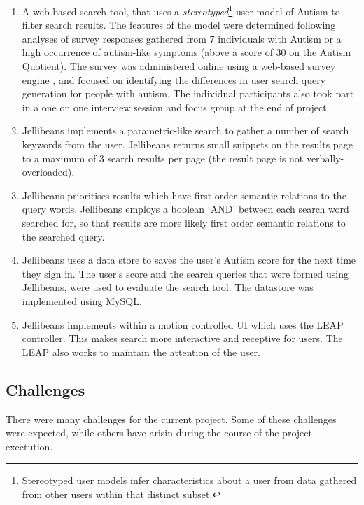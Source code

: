 \documentclass[a4paper, 11pt]{article}
\begin{document}
\begin{enumerate}
\item {A web-based search tool, that uses a \textit{stereotyped}\footnote{Stereotyped user models infer characteristics about a user from data gathered from other users within that distinct subset.} user model of Autism to filter search results. The features of the model were determined following analyses of survey responses gathered from 7 individuals with Autism or a high occurrence of autism-like symptoms (above a score of 30 on the Autism Quotient). The survey was administered online using a web-based survey engine \cite{surveymonkey}, and focused on identifying the differences in user search query generation for people with autism. The individual participants also took part in a one on one interview session and focus group at the end of project.}

\item {Jellibeans implements a parametric-like search to gather a number of search keywords from the user. Jellibeans returns small snippets on the results page to a maximum of 3 search results per page (the result page is not verbally-overloaded).}

\item {Jellibeans prioritises results which have first-order semantic relations to the query words. Jellibeans employs a boolean `AND' between each search word searched for, so that results are more likely first order semantic relations to the searched query.}

\item {Jellibeans uses a data store to saves the user's Autism score for the next time they sign in. The user's score and the search queries that were formed using Jellibeans, were used to evaluate the search tool. The datastore was implemented using MySQL.}

\item {Jellibeans implements within a motion controlled UI which uses the LEAP controller. This makes search more interactive and receptive for users. The LEAP also works to maintain the attention of the user.}


\end{enumerate}

\subsection {Challenges}
There were many challenges for the current project. Some of these challenges were expected, while others have arisin during the course of the project exectution. 
\end{document}
